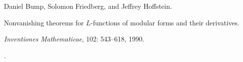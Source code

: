Daniel Bump, Solomon Friedberg, and Jeffrey Hoffstein.

\newblock Nonvanishing theorems for {$L$}-functions of modular forms and their derivatives.

\newblock \emph{Inventiones Mathematicae}, 102: 543--618, 1990.

\newblock {}.

